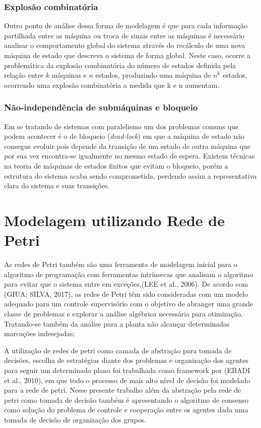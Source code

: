 \subsubsection{Explosão combinatória}
Outro ponto de análise dessa forma de modelagem é que para cada informação partilhada entre as máquina ou troca de sinais entre as máquinas é necessário analisar o comportamento global do sistema através do recálculo de uma nova máquina de estado que descreva o sistema de forma global. Neste caso, ocorre a problemática da explosão combinatória do número de estados definida pela relação entre $k$ máquinas e $n$ estados, produzindo uma máquina de $n^k $ estados, ocorrendo uma explosão combinatória a medida que k e n aumentam.

\subsubsection{Não-independência de submáquinas e bloqueio}
Em se tratando de sistemas com paralelismo um dos problemas comuns que podem acontecer é o de bloqueio (\textit{dead-lock}) em que a máquina de estado não consegue evoluir pois depende da transição de um estado de outra máquina que por sua vez encontra-se igualmente no mesmo estado de espera. Existem técnicas na teoria de máquinas de estados finitos que evitam o bloqueio, porém a estrutura do sistema acaba sendo comprometida, perdendo assim a representativa clara do sistema e suas transições.

\section{Modelagem utilizando Rede de Petri}
As redes de Petri também são uma ferramenta de modelagem inicial para o algoritmo de programação com ferramentas intrínsecas que analisam o algoritmo para evitar que o sistema entre em exceções,(LEE et al., 2006). 
De acordo com (GIUA; SILVA, 2017), as redes de Petri têm sido consideradas com um modelo adequado para um controle supervisório com o objetivo de abranger uma grande classe de problemas e explorar a análise algébrica necessária para otimização. Tratando-se também da análise para a planta não alcançar determinadas marcações indesejadas;

A utilização de redes de petri como camada de abstração para tomada de decisões, escolha de estratégias diante dos problemas e organização dos agentes para seguir um determinado plano foi trabalhada como framework por (EBADI et al., 2010), em que todo o processo de mais alto nível de decisão foi modelado para a rede de petri. Nesse presente trabalho além da abstração pela rede de petri como tomada de decisão também é apresentando o algoritmo de consenso como solução do problema de controle e cooperação entre os agentes dada uma tomada de decisão de organização dos grupos.

